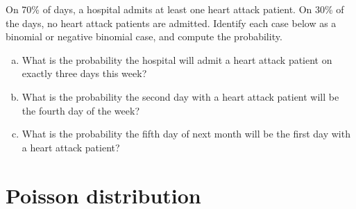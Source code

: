 \begin{exercisewrap}
\begin{nexercise}
On 70\% of days, a hospital admits at least one heart attack patient. On 30\% of the days, no heart attack patients are admitted. Identify each case below as a binomial or negative binomial case, and compute the probability.\footnotemark
\begin{enumerate}[(a)]
\item What is the probability the hospital will admit
    a heart attack patient on exactly three days this week?

\item What is the probability the second day with a heart
    attack patient will be the fourth day of the week?

\item What is the probability the fifth day of next month
    will be the first day with a heart attack patient?
\end{enumerate}
\end{nexercise}
\end{exercisewrap}





\section{Poisson distribution}
\label{poisson}


